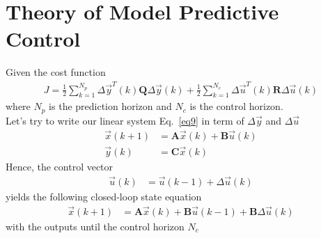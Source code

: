 \documentclass[11pt,a4paper,oneside]{book}
\numberwithin{equation}{section}
\theoremstyle{it}
\theoremstyle{definition}
\begin{document}
\section{Theory of Model Predictive Control}
Given the cost function 
\begin{equation}\label{eq8}
	\begin{aligned}
		J = 
		\frac{1}{2}\sum_{k=1}^{N_p}\Delta\vec{y}^T(k)\mathbf{Q}\Delta\vec{y}(k)+\frac{1}{2}\sum_{k=1}^{N_c}\Delta\vec{u}^T(k)\mathbf{R}\Delta\vec{u}(k)
	\end{aligned}
\end{equation}
where $N_p$ is the prediction horizon and $N_c$ is the control horizon.\\

Let's try to write our linear system Eq.~\eqref{eq9} in term of $\Delta\vec{y}$ 
and $\Delta\vec{u}$
\begin{equation}\label{eq9}
	\begin{aligned}
		\vec{x}(k+1) &= \mathbf{A}\vec{x}(k) + \mathbf{B}\vec{u}(k) \\[6pt]
		\vec{y}(k) &= \mathbf{C}\vec{x}(k)
	\end{aligned}
\end{equation}
Hence, the control vector
\begin{equation}\label{eq10}
	\begin{aligned}
		\vec{u}(k) &= \vec{u}(k-1) + \Delta\vec{u}(k)
	\end{aligned}
\end{equation}
yields the following closed-loop state equation
\begin{equation}\label{eq11}
	\begin{aligned}
		\vec{x}(k+1) &= \mathbf{A}\vec{x}(k)+\mathbf{B}\vec{u}(k-1) + 
		\mathbf{B}\Delta\vec{u}(k)
	\end{aligned}
\end{equation}
with the outputs until the control horizon $N_c$
\end{document}
